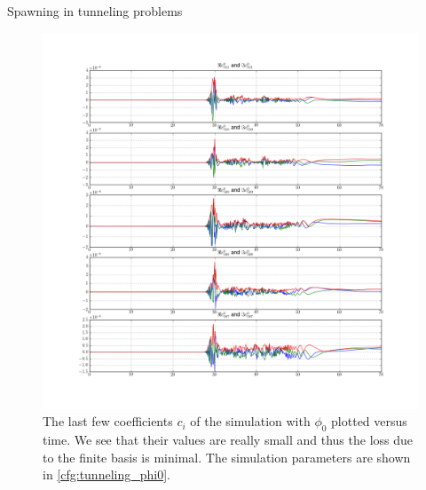 \begin{chapter}{Spawning in tunneling problems}
\begin{figure}
  \centering
  \includegraphics[width=\the\linewidth]{./figures/tunnel_basic/coefficients_last_phi0.png}
  \caption[The last few coefficients $c_i$ of the simulation with $\phi_0$]
  {The last few coefficients $c_i$ of the simulation with $\phi_0$ plotted versus time.
  We see that their values are really small and thus the loss due to the finite basis is minimal.
  The simulation parameters are shown in \ref{cfg:tunneling_phi0}.}
\end{figure}


\end{chapter}
